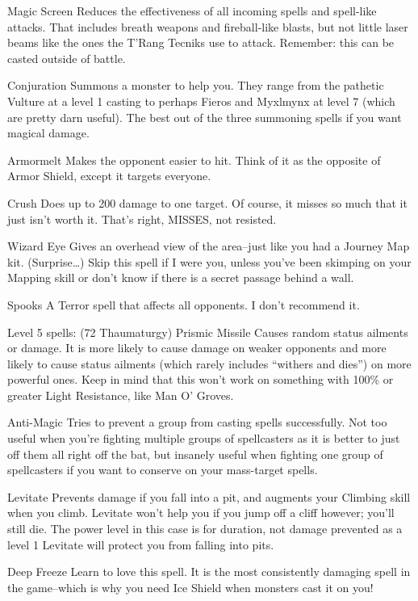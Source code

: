 \documentclass[12pt]{article}
\begin{document}
Magic Screen Reduces the effectiveness of all incoming spells and
spell-like attacks. That includes breath weapons and fireball-like
blasts, but not little laser beams like the ones the T'Rang Tecniks use
to attack. Remember: this can be casted outside of battle.

Conjuration Summons a monster to help you. They range from the pathetic
Vulture at a level 1 casting to perhaps Fieros and Myxlmynx at level 7
(which are pretty darn useful). The best out of the three summoning
spells if you want magical damage.

Armormelt Makes the opponent easier to hit. Think of it as the opposite
of Armor Shield, except it targets everyone.

Crush Does up to 200 damage to one target. Of course, it misses so much
that it just isn't worth it. That's right, MISSES, not resisted.

Wizard Eye Gives an overhead view of the area--just like you had a
Journey Map kit. (Surprise\ldots{}) Skip this spell if I were you,
unless you've been skimping on your Mapping skill or don't know if there
is a secret passage behind a wall.

Spooks A Terror spell that affects all opponents. I don't recommend it.

Level 5 spells: (72 Thaumaturgy) Prismic Missile Causes random status
ailments or damage. It is more likely to cause damage on weaker
opponents and more likely to cause status ailments (which rarely
includes ``withers and dies'') on more powerful ones. Keep in mind that
this won't work on something with 100\% or greater Light Resistance,
like Man O' Groves.

Anti-Magic Tries to prevent a group from casting spells successfully.
Not too useful when you're fighting multiple groups of spellcasters as
it is better to just off them all right off the bat, but insanely useful
when fighting one group of spellcasters if you want to conserve on your
mass-target spells.

Levitate Prevents damage if you fall into a pit, and augments your
Climbing skill when you climb. Levitate won't help you if you jump off a
cliff however; you'll still die. The power level in this case is for
duration, not damage prevented as a level 1 Levitate will protect you
from falling into pits.

Deep Freeze Learn to love this spell. It is the most consistently
damaging spell in the game--which is why you need Ice Shield when
monsters cast it on you!
\end{document}
